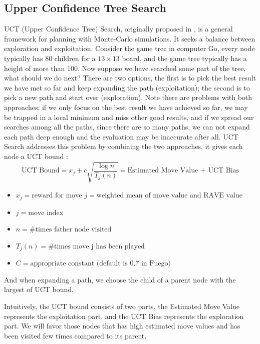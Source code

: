 \subsection{Upper Confidence Tree Search}
UCT (Upper Confidence Tree) Search, originally proposed in \cite{kocsis2006bandit}, is a general framework for planning with Monte-Carlo simulations. It seeks a balance between exploration and exploitation. Consider the game tree in computer Go, every node typically has $80$ children for a $13\times 13$ board, and the game tree typically has a height of more than $100$. Now suppose we have searched some part of the tree, what should we do next? There are two options, the first is to pick the best result we have met so far and keep expanding the path (exploitation); the second is to pick a new path and start over (exploration). Note there are problems with both approaches: if we only focus on the best result we have achieved so far, we may be trapped in a local minimum and miss other good results, and if we spread our searches among all the paths, since there are so many paths, we can not expand each path deep enough and the evaluation may be inaccurate after all. UCT Search addresses this problem by combining the two approaches, it gives each node a UCT bound \cite{grace2010fuego}:
\begin{equation}
\text{UCT Bound} = x_j + c \sqrt {\frac {\log n} {T_j(n)}} = \text{Estimated Move Value + UCT Bias}
\end{equation}
\begin{itemize}
\item $x_j = \text{reward for move $j$} = \text{weighted mean of move value and RAVE value}$
\item $j   = \text{move index}$
\item $n   =  \# \text{times father node visited}$
\item $T_j(n)  =  \# \text{times move j has been played}$
\item $C    =  \text{appropriate constant (default is $0.7$ in Fuego)}$
\end{itemize}

And when expanding a path, we choose the child of a parent node with the largest of UCT bound.

Intuitively, the UCT bound consists of two parts, the Estimated Move Value represents the exploitation part, and the UCT Bias represents the exploration part. We will favor those nodes that has high estimated move values and has been visited few times compared to its parent.

